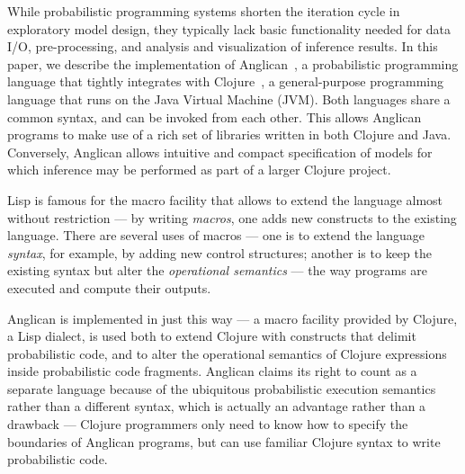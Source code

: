 \documentclass[preprint]{sigplanconf}
\begin{document}
While probabilistic programming systems shorten the iteration cycle in
exploratory model design, they typically lack basic functionality needed for
data I/O, pre-processing, and analysis and visualization of inference results.
In this paper, we describe the implementation of
Anglican~\cite{TMW15, Anglican}, a probabilistic
programming language that tightly integrates with
Clojure~\cite{H08,Clojure}, a general-purpose programming language
that runs on the Java Virtual Machine (JVM). Both languages share a common
syntax, and can be invoked from each other. This allows Anglican programs to
make use of a rich set of libraries written in both Clojure and Java.
Conversely, Anglican allows intuitive and compact specification of models for
which inference may be performed as part of a larger Clojure project.

\iftoggle{full}{%
There are several ways to build a programming language
on top of or besides another language.  The easiest is an
interpreter --- a program that reads a program, in its entirety
or line-by-line, and executes it by applying operational
semantics of a certain kind to the language. \textsc{Basic} is
famous for line-by-line interpreted implementations.

Another approach is to write a compiler, either to a virtual
architecture, so called p-code or byte-code, or to real
hardware. Here, the whole program is translated from the
`higher-level' source language to a `lower-level' object
language, which can be directly executed, either by hardware or
by an interpreter --- but the latter interpreter can be made
simpler and more efficient  than an interpreter for the source
language.

On top of these two approaches are methods in which a new
language is implemented `inside' another language of the same
level of abstraction. Different languages provide different
means for this; }{%
There are several ways to build a new language on top of an
existing one;
}%
Lisp is famous for the macro facility
that allows to extend the language almost without
restriction --- by writing \textit{macros}, one adds new
constructs to the existing language. There are several uses of
macros --- one is to extend the language \textit{syntax}, for
example, by adding new control structures; another is to keep
the existing syntax but alter the \textit{operational semantics}
--- the way programs are executed and compute their outputs.

Anglican is implemented in just this way --- a macro facility
provided by Clojure, a Lisp dialect, is used both to extend
Clojure with constructs that delimit probabilistic code, and to
alter the operational semantics of Clojure expressions inside
probabilistic code fragments. Anglican claims its right to count
as a separate language
because of the ubiquitous probabilistic
execution semantics rather than a different syntax,
which is actually an advantage rather than a drawback ---
Clojure programmers only need to know how to specify the
boundaries of Anglican programs, but can use familiar Clojure
syntax to write probabilistic code.
\end{document}
